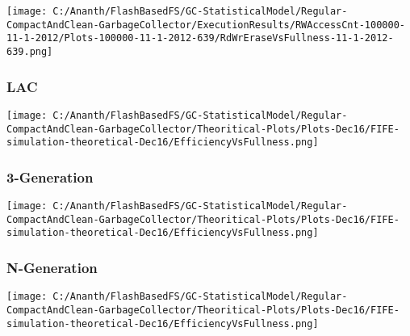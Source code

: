 \begin{SCfigure}
	\centering
	\texttt{[image: C:/Ananth/FlashBasedFS/GC-StatisticalModel/Regular-CompactAndClean-GarbageCollector/ExecutionResults/RWAccessCnt-100000-11-1-2012/Plots-100000-11-1-2012-639/RdWrEraseVsFullness-11-1-2012-639.png]}
\end{SCfigure}


\subsubsection{LAC}

\begin{SCfigure}
	\centering
	\texttt{[image: C:/Ananth/FlashBasedFS/GC-StatisticalModel/Regular-CompactAndClean-GarbageCollector/Theoritical-Plots/Plots-Dec16/FIFE-simulation-theoretical-Dec16/EfficiencyVsFullness.png]}
\end{SCfigure}

\subsubsection{3-Generation}

\begin{SCfigure}
	\centering
	\texttt{[image: C:/Ananth/FlashBasedFS/GC-StatisticalModel/Regular-CompactAndClean-GarbageCollector/Theoritical-Plots/Plots-Dec16/FIFE-simulation-theoretical-Dec16/EfficiencyVsFullness.png]}
\end{SCfigure}

\subsubsection{N-Generation}
\begin{SCfigure}
	\centering
	\texttt{[image: C:/Ananth/FlashBasedFS/GC-StatisticalModel/Regular-CompactAndClean-GarbageCollector/Theoritical-Plots/Plots-Dec16/FIFE-simulation-theoretical-Dec16/EfficiencyVsFullness.png]}
\end{SCfigure}

